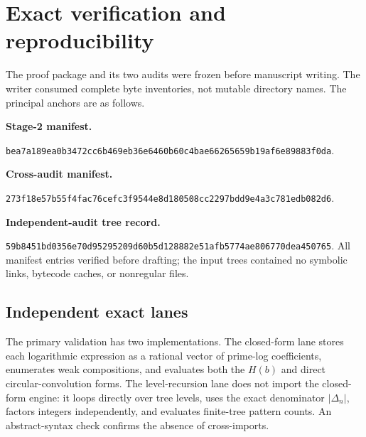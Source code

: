 \section{Exact verification and reproducibility}
\label{app:reproducibility}

The proof package and its two audits were frozen before manuscript writing.
The writer consumed complete byte inventories, not mutable directory names.
The principal anchors are as follows.

\noindent\textbf{Stage-2 manifest.}\par
\noindent\texttt{bea7a189ea0b3472cc6b469eb36e6460b60c4bae66265659b19af6e89883f0da}.

\noindent\textbf{Cross-audit manifest.}\par
\noindent\texttt{273f18e57b55f4fac76cefc3f9544e8d180508cc2297bdd9e4a3c781edb082d6}.

\noindent\textbf{Independent-audit tree record.}\par
\noindent\texttt{59b8451bd0356e70d95295209d60b5d128882e51afb5774ae806770dea450765}.
All manifest entries verified before drafting; the input trees contained no
symbolic links, bytecode caches, or nonregular files.

\subsection{Independent exact lanes}

The primary validation has two implementations.  The closed-form lane stores
each logarithmic expression as a rational vector of prime-log coefficients,
enumerates weak compositions, and evaluates both the $H(b)$ and direct
circular-convolution forms.  The level-recursion lane does not import the
closed-form engine: it loops directly over tree levels, uses the exact
denominator $|\Delta_n|$, factors integers independently, and evaluates
finite-tree pattern counts.  An abstract-syntax check confirms the absence of
cross-imports.

